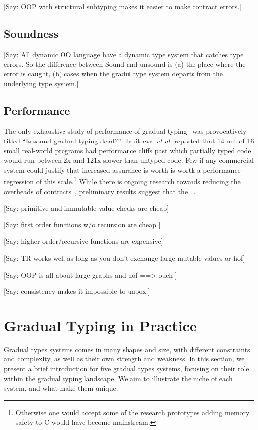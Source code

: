 \documentclass[a4paper,USenglish]{tex/lipics-v2016}
\begin{document}
[Say: OOP with structural subtyping makes it easier to make contract errors.]


\subsection{Soundness}

[Say: All dynamic OO language have a dynamic type system that catches type errors.  
So the difference between Sound and unsound is (a) the place where the error is caught, 
(b) cases when the gradul type system departs from the underlying type system.]  

\subsection{Performance}

The only exhaustive study of performance of gradual typing~\cite{popl16} was
provocatively titled ``Is sound gradual typing dead?''.  Takikawa~\emph{et
  al.}  reported that 14 out of 16 small real-world programs had performance
cliffs past which partially typed code would run between 2x and 121x slower
than untyped code. Few if any commercial system could justify that increased
assurance is worth is worth a performance regression of this
scale.\footnote{Otherwise one would accept some of the research prototypes
  adding memory safety to C would have become mainstream.} While there is
ongoing research towards reducing the overheads of
contracts~\cite{pycket15}, preliminary results suggest that the ...


[Say: primitive and immutable value checks are cheap]

[Say: first order functions w/o recursion are cheap ]

[Say: higher order/recursive functions are expensive]

[Say: TR works well as long as you don't exchange large mutable values or hof]

[Say: OOP is all about large graphs and hof ==> ouch ]

[Say: consistency makes it impossible to unbox.]

\section{Gradual Typing in Practice}

Gradual types systems comes in many shapes and size, with different constraints 
and complexity, as well as their own strength and weakness. In this section, we present 
a brief introduction for five gradual types systems, focusing on their role within 
the gradual typing landscape. We aim to illustrate the niche of each system, and what 
make them unique. 
\end{document}
